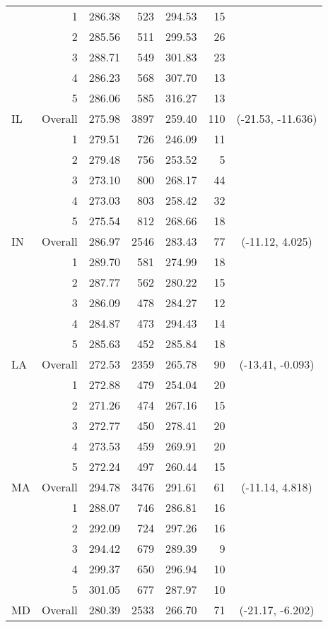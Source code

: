 \begin{longtable}{lrrr@{\extracolsep{.25cm}}rrc}
   & 1 & 286.38 & 523 & 294.53 &  15 &  \\ 
   & 2 & 285.56 & 511 & 299.53 &  26 &  \\ 
   & 3 & 288.71 & 549 & 301.83 &  23 &  \\ 
   & 4 & 286.23 & 568 & 307.70 &  13 &  \\ 
   & 5 & 286.06 & 585 & 316.27 &  13 &  \\ 
   \hline
IL & Overall & 275.98 & 3897 & 259.40 & 110 & (-21.53, -11.636) \\ 
   & 1 & 279.51 & 726 & 246.09 &  11 &  \\ 
   & 2 & 279.48 & 756 & 253.52 &   5 &  \\ 
   & 3 & 273.10 & 800 & 268.17 &  44 &  \\ 
   & 4 & 273.03 & 803 & 258.42 &  32 &  \\ 
   & 5 & 275.54 & 812 & 268.66 &  18 &  \\ 
   \hline
IN & Overall & 286.97 & 2546 & 283.43 &  77 & (-11.12,   4.025) \\ 
   & 1 & 289.70 & 581 & 274.99 &  18 &  \\ 
   & 2 & 287.77 & 562 & 280.22 &  15 &  \\ 
   & 3 & 286.09 & 478 & 284.27 &  12 &  \\ 
   & 4 & 284.87 & 473 & 294.43 &  14 &  \\ 
   & 5 & 285.63 & 452 & 285.84 &  18 &  \\ 
   \hline
LA & Overall & 272.53 & 2359 & 265.78 &  90 & (-13.41,  -0.093) \\ 
   & 1 & 272.88 & 479 & 254.04 &  20 &  \\ 
   & 2 & 271.26 & 474 & 267.16 &  15 &  \\ 
   & 3 & 272.77 & 450 & 278.41 &  20 &  \\ 
   & 4 & 273.53 & 459 & 269.91 &  20 &  \\ 
   & 5 & 272.24 & 497 & 260.44 &  15 &  \\ 
   \hline
MA & Overall & 294.78 & 3476 & 291.61 &  61 & (-11.14,   4.818) \\ 
   & 1 & 288.07 & 746 & 286.81 &  16 &  \\ 
   & 2 & 292.09 & 724 & 297.26 &  16 &  \\ 
   & 3 & 294.42 & 679 & 289.39 &   9 &  \\ 
   & 4 & 299.37 & 650 & 296.94 &  10 &  \\ 
   & 5 & 301.05 & 677 & 287.97 &  10 &  \\ 
   \hline
MD & Overall & 280.39 & 2533 & 266.70 &  71 & (-21.17,  -6.202) \\ 

\end{longtable}
